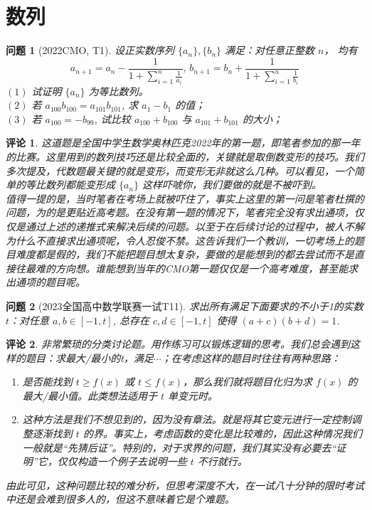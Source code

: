 \documentclass[UTF8,oneside,11pt]{book}
\theoremstyle{plain}\newtheorem{thm}{定理}[chapter]
\theoremstyle{definition}\newtheorem{definition}[thm]{定义}
\theoremstyle{plain}\newtheorem{axiom}[thm]{公理}
\theoremstyle{plain}\newtheorem{coro}[thm]{推论}
\theoremstyle{plain}\newtheorem{lemma}[thm]{引理}
\theoremstyle{plain}\newtheorem{prop}[thm]{性质}
\theoremstyle{plain}\newtheorem{conj}[thm]{猜想}
\theoremstyle{plain}\newtheorem{ques}[thm]{问题}
\theoremstyle{plain}\newtheorem{const}[thm]{构造}
\theoremstyle{remark}\newtheorem{notation}[thm]{注记}
\theoremstyle{plain}\newtheorem*{app}{应用}
\theoremstyle{plain}\newtheorem*{exam}{测试}
\theoremstyle{plain}\newtheorem*{exer}{例子}
\theoremstyle{plain}\newtheorem*{remark}{评论}
\theoremstyle{remark}\newtheorem*{note}{\small{注}}
\numberwithin{equation}{section}
\numberwithin{thm}{chapter}
\begin{document}
\section{数列}
\begin{ques}[2022CMO, T1]
    设正实数序列 $ \{a_n\},\{b_n\} $ 满足：对任意正整数 $ n  $， 均有
    \begin{equation}
        a_{n+1}=a_n-\frac{1 }{1+\sum\limits_{i=1}^n\frac{1 }{a_i}},\,b_{n+1}=b_n+\frac{1 }{1+\sum\limits_{i=1}^n\frac{1 }{b_i}}
    \end{equation}
    $ (1) $ 试证明 $ \{a_n\} $ 为等比数列。\\ 
    $ (2) $ 若 $ a_{100}b_{100}=a_{101}b_{101} $, 求 $ a_1-b_1 $ 的值；\\
    $ (3) $ 若 $ a_{100}=-b_{99} $, 试比较 $ a_{100}+b_{100} $ 与 $ a_{101}+b_{101}  $ 的大小；
\end{ques}
\begin{remark}
    这道题是全国中学生数学奥林匹克2022年的第一题，即笔者参加的那一年的比赛。这里用到的数列技巧还是比较全面的，关键就是取倒数变形的技巧。我们多次提及，代数题最关键的就是变形，而变形无非就这么几种。可以看见，一个简单的等比数列都能变形成 $ \{a_n\} $ 这样吓唬你，我们要做的就是不被吓到。\\
    值得一提的是，当时笔者在考场上就被吓住了，事实上这里的第一问是笔者杜撰的问题，为的是更贴近高考题。在没有第一题的情况下，笔者完全没有求出通项，仅仅是通过上述的递推式来解决后续的问题。以至于在后续讨论的过程中，被人不解为什么不直接求出通项呢，令人忍俊不禁。这告诉我们一个教训，一切考场上的题目难度都是假的，我们不能把题目想太复杂，要做的是能想到的都去尝试而不是直接往最难的方向想。谁能想到当年的\textrm{CMO}第一题仅仅是一个高考难度，甚至能求出通项的题目呢。
\end{remark}
\begin{ques}[2023全国高中数学联赛一试T11]
    求出所有满足下面要求的不小于1的实数 $ t  $：对任意 $ a,b\in[-1,t] $, 总存在 $ c,d\in[-1,t]  $ 使得 $ (a+c)(b+d)=1 $.
\end{ques} 
\begin{remark}
    非常繁琐的分类讨论题。用作练习可以锻炼逻辑的思考。我们总会遇到这样的题目：求最大/最小的t，满足$ \cdots $；在考虑这样的题目时往往有两种思路：
    \begin{enumerate}
        \item 是否能找到 $ t \geq f(x) $ 或 $ t \leq f(x)  $，那么我们就将题目化归为求 $ f(x)  $ 的最大/最小值。此类想法适用于 $ t  $ 单变元时。
        \item  这种方法是我们不想见到的，因为没有章法。就是将其它变元进行一定控制调整逐渐找到 $ t  $ 的界。事实上，考虑函数的变化是比较难的，因此这种情况我们一般就是“先猜后证”。特别的，对于求界的问题，我们其实没有必要去“证明”它，仅仅构造一个例子去说明一些 $ t $ 不行就行。 
    \end{enumerate} 
    由此可见，这种问题比较的难分析，但思考深度不大，在一试八十分钟的限时考试中还是会难到很多人的，但这不意味着它是个难题。
\end{remark}
\end{document}
